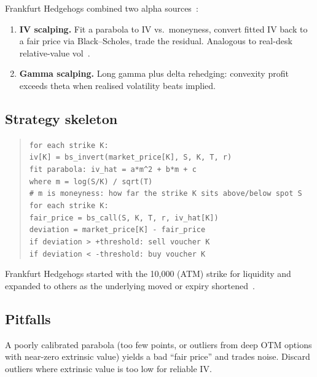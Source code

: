Frankfurt Hedgehogs combined two alpha
sources~\citep{frankfurthedgehogs2025}:

\begin{enumerate}
  \item \textbf{IV scalping.}  Fit a parabola to IV vs.\ moneyness,
  convert fitted IV back to a fair price via Black--Scholes, trade
  the residual.  Analogous to real-desk relative-value
  vol~\citep{sinclair2013volatility}.
  \item \textbf{Gamma scalping.}  Long gamma plus delta rehedging:
  convexity profit exceeds theta when realised volatility beats
  implied.
\end{enumerate}

\subsection{Strategy skeleton}

\begin{quote}
\texttt{for each strike K:}\\
\quad\texttt{iv[K] = bs\_invert(market\_price[K], S, K, T, r)}\\
\texttt{fit parabola: iv\_hat = a*m\^{}2 + b*m + c}\\
\quad\texttt{where m = log(S/K) / sqrt(T)}\\
\quad\texttt{\# m is moneyness: how far the strike K sits above/below spot S}\\
\texttt{for each strike K:}\\
\quad\texttt{fair\_price = bs\_call(S, K, T, r, iv\_hat[K])}\\
\quad\texttt{deviation = market\_price[K] - fair\_price}\\
\quad\texttt{if deviation > +threshold: sell voucher K}\\
\quad\texttt{if deviation < -threshold: buy voucher K}
\end{quote}

\noindent
Frankfurt Hedgehogs started with the 10{,}000 (ATM) strike for
liquidity and expanded to others as the underlying moved or expiry
shortened~\citep{frankfurthedgehogs2025}.

\subsection{Pitfalls}

\begin{pitfallbox}
A poorly calibrated parabola (too few points, or outliers from deep
OTM options with near-zero extrinsic value) yields a bad ``fair
price'' and trades noise.  Discard outliers where extrinsic value is
too low for reliable IV.
\end{pitfallbox}

